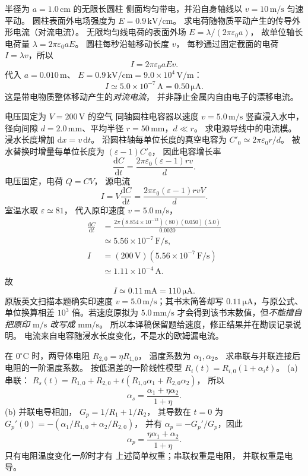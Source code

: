 半径为 $a=1.0\,\mathrm{cm}$ 的无限长圆柱
侧面均匀带电，并沿自身轴线以
$v=10\,\mathrm{m/s}$ 匀速平动。
圆柱表面外电场强度为
$E=0.9\,\mathrm{kV/cm}$。
求电荷随物质平动产生的传导外形电流（对流电流）。
\exsolution
无限均匀线电荷的表面外场
$E=\lambda/(2\pi\varepsilon_0a)$，
故单位轴长电荷量
$\lambda=2\pi\varepsilon_0aE$。
圆柱每秒沿轴移动长度 $v$，
每秒通过固定截面的电荷
$I=\lambda v$，所以
\[
\boxed{I=2\pi\varepsilon_0aEv}.
\]
代入 $a=0.010\,\mathrm m$、
$E=0.9\,\mathrm{kV/cm}
=9.0\times10^4\,\mathrm{V/m}$：
\[
\boxed{I\simeq5.0\times10^{-7}\,\mathrm A
=0.50\,\mathrm{\mu A}}.
\]
\excheck 这是带电物质整体移动产生的\emph{对流电流}，
并非静止金属内自由电子的漂移电流。

电压固定为 $V=200\,\mathrm V$ 的空气
同轴圆柱电容器以速度 $v=5.0\,\mathrm{m/s}$
竖直浸入水中，径向间隙
$d=2.0\,\mathrm{mm}$、平均半径
$r=50\,\mathrm{mm}$，$d\ll r$。
求电源导线中的电流模。
\exsolution
浸水长度增加 $\mathrm dx=v\,\mathrm dt$。
沿圆柱轴每单位长度的真空电容为
$C'_0\simeq2\pi\varepsilon_0r/d$。
被水替换时增量每单位长度为
$(\varepsilon-1)C'_0$，
因此电容增长率
\[
\frac{\mathrm dC}{\mathrm dt}
=\frac{2\pi\varepsilon_0(\varepsilon-1)rv}{d}.
\]
电压固定，电荷 $Q=CV$，
源电流
\[
\boxed{I=V\frac{\mathrm dC}{\mathrm dt}
=\frac{2\pi\varepsilon_0(\varepsilon-1)rvV}{d}}.
\]
室温水取 $\varepsilon\simeq81$，
代入原印速度 $v=5.0\,\mathrm{m/s}$，
\[
\begin{aligned}
\frac{\mathrm dC}{\mathrm dt}
&=\frac{2\pi(8.854\times10^{-12})(80)
(0.050)(5.0)}{0.0020}
\\
&\simeq5.56\times10^{-7}\,\mathrm{F/s},
\\
I&=(200\,\mathrm V)(5.56\times10^{-7}\,\mathrm{F/s})
\\
&\simeq1.11\times10^{-4}\,\mathrm A.
\end{aligned}
\]
故
\[
\boxed{I\simeq0.11\,\mathrm{mA}
=110\,\mathrm{\mu A}}.
\]
\excheck 原版英文扫描本题确实印速度
$v=5.0\,\mathrm{m/s}$；其书末简答却写
$0.11\,\mathrm{\mu A}$，与原公式、单位换算相差
$10^3$ 倍。若速度原拟为 $5.0\,\mathrm{mm/s}$
才会得到该书末数值，但\emph{不能擅自把原印
$\mathrm{m/s}$ 改写成 $\mathrm{mm/s}$}。
所以本译稿保留题给速度，修正结果并在勘误记录说明。
电流来自电容随浸水长度变化，不是水的欧姆漏电流。

在 $0^\circ\mathrm C$ 时，两导体电阻
$R_{2,0}=\eta R_{1,0}$，
温度系数为 $\alpha_1,\alpha_2$。
求串联与并联连接后电阻的一阶温度系数。
\exsolution
按低温差的一阶线性模型
$R_i(t)=R_{i,0}(1+\alpha_i t)$。
(a) 串联：
$R_s(t)=R_{1,0}+R_{2,0}
+t(R_{1,0}\alpha_1+R_{2,0}\alpha_2)$，
所以
\[
\boxed{\alpha_s=
\frac{\alpha_1+\eta\alpha_2}{1+\eta}}.
\]
(b) 并联电导相加，
$G_p=1/R_1+1/R_2$，
其导数在 $t=0$ 为
$G_p'(0)=-(\alpha_1/R_{1,0}
+\alpha_2/R_{2,0})$，
并有
$\alpha_p=-G_p'/G_p$，因此
\[
\boxed{\alpha_p=
\frac{\eta\alpha_1+\alpha_2}{1+\eta}}.
\]
\excheck 只有电阻温度变化\emph{一阶}时才有
上述简单权重；串联权重是电阻，
并联权重是电导。

